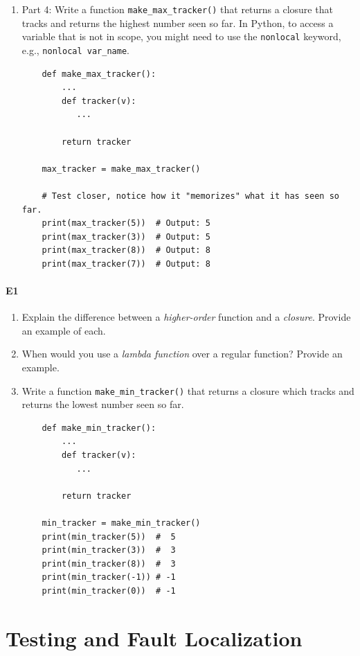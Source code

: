 \documentclass[oneside,11pt,dvipsnames]{book}
\newcommand{\code}[1]{\texttt{#1}}
\begin{document}
\begin{enumerate}
\item Part 4: Write a function \code{make\_max\_tracker()} that returns a closure that tracks and returns the highest number seen so far. In Python, to access a variable that is not in scope, you might need to use the \code{nonlocal} keyword, e.g., \code{nonlocal var\_name}.
\begin{lstlisting}
    def make_max_tracker():
        ...
        def tracker(v):
           ...
        
        return tracker

    max_tracker = make_max_tracker()

    # Test closer, notice how it "memorizes" what it has seen so far.
    print(max_tracker(5))  # Output: 5
    print(max_tracker(3))  # Output: 5
    print(max_tracker(8))  # Output: 8
    print(max_tracker(7))  # Output: 8
\end{lstlisting} 

\end{enumerate}

\subsection{E1}\label{exercise:e1}
\begin{enumerate}
    \item Explain the difference between a \emph{higher-order} function and a \emph{closure}. Provide an example of each.
    \item When would you use a \emph{lambda function} over a regular function? Provide an example.
    \item Write a function \code{make\_min\_tracker()} that returns a closure which tracks and returns the lowest number seen so far.
    \begin{lstlisting}
    def make_min_tracker():
        ...
        def tracker(v):
           ...
        
        return tracker

    min_tracker = make_min_tracker()
    print(min_tracker(5))  #  5
    print(min_tracker(3))  #  3
    print(min_tracker(8))  #  3
    print(min_tracker(-1)) # -1
    print(min_tracker(0))  # -1
    \end{lstlisting}
\end{enumerate}

\part{Testing and Fault Localization}
\end{document}
